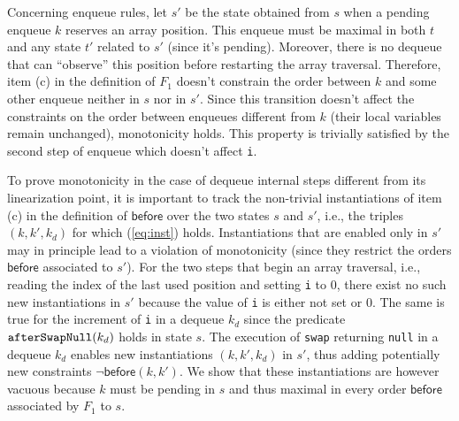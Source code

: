 Concerning enqueue rules, let $s'$ be the state obtained from $s$ when a pending enqueue $k$ reserves an array position. This enqueue must be maximal in both $t$ and any state $t'$ related to $s'$ (since it's pending). Moreover, there is no dequeue that can ``observe'' this position before restarting the array traversal. Therefore, item (c) in the definition of $F_1$ doesn't constrain the order between $k$ and some other enqueue neither in $s$ nor in $s'$. Since this transition doesn't affect the constraints on the order between enqueues different from $k$ (their local variables remain unchanged), monotonicity holds. This property is trivially satisfied by the second step of enqueue which doesn't affect {\tt i}.

To prove monotonicity in the case of dequeue internal steps different from its linearization point, it is important to track the non-trivial instantiations of item (c) in the definition of $\mathsf{before}$ over the two states $s$ and $s'$, i.e., the triples $(k,k',k_d)$ for which (\ref{eq:inst}) holds. Instantiations that are enabled only in $s'$ may in principle lead to a violation of monotonicity (since they restrict the orders $\mathsf{before}$ associated to $s'$). For the two steps that begin an array traversal, i.e., reading the index of the last used position and setting {\tt i} to $0$, there exist no  such new instantiations in $s'$ because the value of {\tt i} is either not set or $0$. %
%
%
%
%
The same is true for the increment of {\tt i} in a dequeue $k_d$ since the predicate ${\tt afterSwapNull}(k_d)$ holds in state $s$.
The execution of {\tt swap} returning {\tt null} in a dequeue $k_d$ enables new instantiations $(k,k',k_d)$ in $s'$, thus adding potentially new constraints $\neg \mathsf{before}(k,k')$. We show that these instantiations are however vacuous because $k$ must be pending in $s$ and thus maximal in every order $\mathsf{before}$ associated by $F_1$ to $s$.
